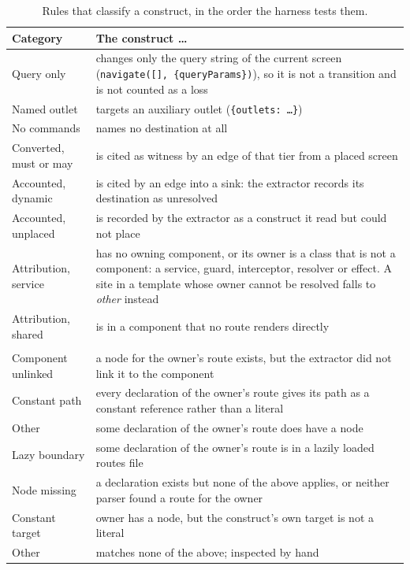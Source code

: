 \begin{table}[t]\small
\caption{Rules that classify a construct, in the order the harness tests them.}
\label{tab:loss-rules}
\begin{tabularx}{\textwidth}{@{}lY@{}}
\toprule
Category & The construct \ldots \\
\midrule
Query only & changes only the query string of the current screen
(\texttt{navigate([], \{queryParams\})}), so it is not a transition and is not counted as
a loss \\
Named outlet & targets an auxiliary outlet (\texttt{\{outlets: \ldots\}}) \\
No commands & names no destination at all \\
Converted, must or may & is cited as witness by an edge of that tier from a placed screen \\
Accounted, dynamic & is cited by an edge into a sink: the extractor records its destination as unresolved \\
Accounted, unplaced & is recorded by the extractor as a construct it read but could not place \\
Attribution, service & has no owning component, or its owner is a class that is not a
component: a service, guard, interceptor, resolver or effect. A site in a template whose
owner cannot be resolved falls to \emph{other} instead \\
Attribution, shared & is in a component that no route renders directly \\
\addlinespace
{} \\
\quad Component unlinked & a node for the owner's route exists, but the extractor did not
link it to the component \\
\quad Constant path & every declaration of the owner's route gives its path as a constant
reference rather than a literal \\
\quad Other & some declaration of the owner's route does have a node \\
\quad Lazy boundary & some declaration of the owner's route is in a lazily loaded routes
file \\
\quad Node missing & a declaration exists but none of the above applies, or neither parser
found a route for the owner \\
\addlinespace
Constant target & owner has a node, but the construct's own target is not a literal \\
Other & matches none of the above; inspected by hand \\
\bottomrule
\end{tabularx}
\par{}
\end{table}

